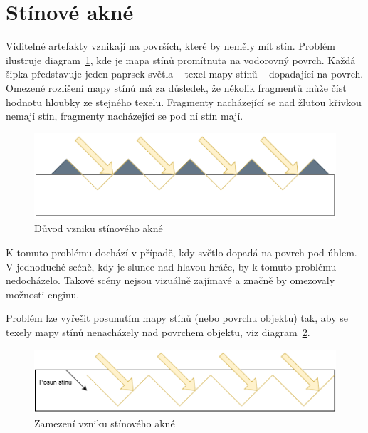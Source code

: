 \documentclass[thesis=M,czech]{FITthesis}[2019/12/23]
\begin{document}
\section{Stínové akné}

Viditelné artefakty vznikají na površích, které by neměly mít stín. Problém ilustruje diagram~\ref{fig:shadows_diag_acne}, kde je mapa stínů promítnuta na vodorovný povrch. Každá šipka představuje jeden paprsek světla -- texel mapy stínů -- dopadající na povrch. Omezené rozlišení mapy stínů má za důsledek, že několik fragmentů může číst hodnotu hloubky ze stejného texelu. Fragmenty nacházející se nad žlutou křivkou nemají stín, fragmenty nacházející se pod ní stín mají. 

\begin{figure}\centering
	\includegraphics[width=\textwidth]{images/shadows/diag_acne}
	\caption[Důvod vzniku stínového akné]{Důvod vzniku stínového akné}\label{fig:shadows_diag_acne}
\end{figure}

K tomuto problému dochází v případě, kdy světlo dopadá na povrch pod úhlem. V jednoduché scéně, kdy je slunce nad hlavou hráče, by k tomuto problému nedocházelo. Takové scény nejsou vizuálně zajímavé a značně by omezovaly možnosti enginu.

Problém lze vyřešit posunutím mapy stínů (nebo povrchu objektu) tak, aby se texely mapy stínů nenacházely nad povrchem objektu, viz diagram~\ref{fig:shadows_diag_acne_fix}.

\begin{figure}\centering
	\includegraphics[width=\textwidth]{images/shadows/diag_acne_fix}
	\caption[Zamezení vzniku stínového akné]{Zamezení vzniku stínového akné}\label{fig:shadows_diag_acne_fix}
\end{figure}
\end{document}

